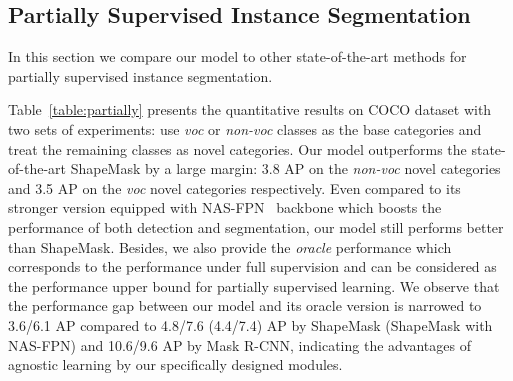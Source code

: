\documentclass[runningheads]{llncs}
\begin{document}
\vspace{-0.15in}
\subsection{Partially Supervised Instance Segmentation}
\vspace{-2mm}

In this section we compare our model to other state-of-the-art methods for partially supervised instance segmentation.

Table~\ref{table:partially} presents the quantitative results on COCO dataset with two sets of experiments: use \emph{voc} or \emph{non-voc} classes as the base categories and treat the remaining classes as novel categories.
Our model outperforms the state-of-the-art ShapeMask by a large margin: 3.8 AP on the \emph{non-voc} novel categories and 3.5 AP on the \emph{voc} novel categories respectively. Even compared to its stronger version equipped with NAS-FPN~\cite{ghiasi2019fpn} backbone which boosts the performance of both detection and segmentation, our model still performs better than ShapeMask. Besides, we also provide the \emph{oracle} performance which corresponds to the 
performance under full supervision and can be considered as the performance upper bound for partially supervised learning.  
We observe that the performance gap between our model and its oracle version is narrowed to 3.6/6.1 AP compared to 4.8/7.6 (4.4/7.4) AP by ShapeMask (ShapeMask with NAS-FPN) and 10.6/9.6 AP by Mask R-CNN, indicating the advantages of agnostic learning by our specifically designed modules. 
\setlength{\tabcolsep}{1.0pt}
\end{document}
